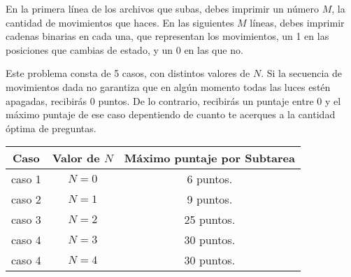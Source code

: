 \documentclass[12pt]{scrartcl}
\begin{document}

    En la primera línea de los archivos que subas, debes imprimir un número $M$, la cantidad de movimientos que haces. 
    En las siguientes $M$ líneas, debes imprimir cadenas binarias en cada una, que representan los movimientos, un 1 en las posiciones que cambias de estado, y un 0 en las que no.

    \newpage
    
    
    Este problema consta de 5 casos, con distintos valores de $N$. Si la secuencia de movimientos dada no garantiza que en algún momento todas las luces estén apagadas, recibirás 0 puntos. De lo contrario, recibirás un puntaje entre 0 y el máximo puntaje de ese caso depentiendo de cuanto te acerques a la cantidad óptima de preguntas. 
    

    \begin{center}
        \begin{tabular}{|c|c|c|}
            \hline
            Caso & Valor de $N$ & Máximo puntaje por Subtarea \\
            \hline
             caso 1 & $N = 0$ & 6 puntos.  \\
            \hline
             caso 2 & $N = 1$ & 9 puntos.  \\
            \hline
            caso 3 & $N = 2$ & 25 puntos. \\
            \hline
            caso 4 & $N = 3$ & 30 puntos. \\
            \hline
            caso 4 & $N = 4$ & 30 puntos. \\
            \hline
        \end{tabular}
    \end{center}
    
        

    
    
\end{document}
